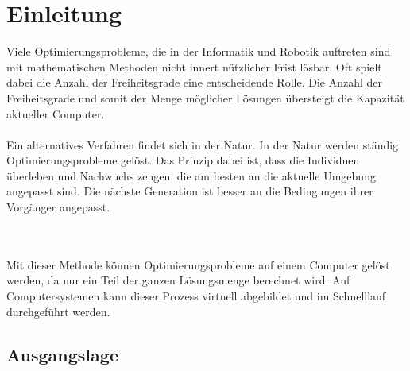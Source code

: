 %
%


\chapter{Einleitung}


  Viele Optimierungsprobleme,
  die in der Informatik und Robotik auftreten sind mit mathematischen Methoden nicht innert nützlicher Frist lösbar.
  Oft spielt dabei die Anzahl der Freiheitsgrade eine entscheidende Rolle.
  Die Anzahl der Freiheitsgrade und somit der Menge möglicher Lösungen übersteigt die Kapazität aktueller Computer.
  \\
  \\


  Ein alternatives Verfahren findet sich in der Natur. In der Natur werden ständig Optimierungsprobleme gelöst.
  Das Prinzip dabei ist, dass die Individuen überleben und Nachwuchs zeugen,
  die am besten an die aktuelle Umgebung angepasst sind.
  Die nächste Generation ist besser an die Bedingungen ihrer Vorgänger angepasst. %





  \\
  \\
  Mit dieser Methode können Optimierungsprobleme auf einem Computer gelöst werden,
  da nur ein Teil der ganzen Lösungsmenge berechnet wird.
  Auf Computersystemen kann dieser Prozess virtuell abgebildet und im Schnelllauf durchgeführt werden.

  \section{Ausgangslage}


